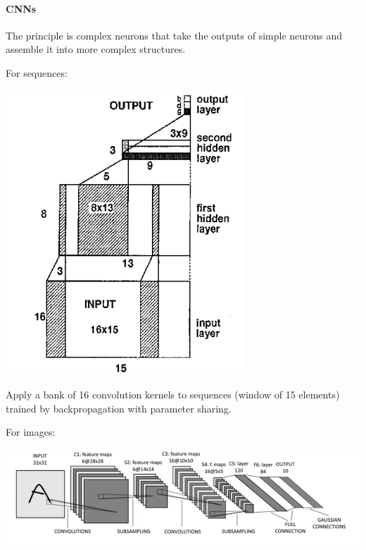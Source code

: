 \documentclass[10pt]{report}
\begin{document}
\paragraph{CNNs} The principle is complex neurons that take the outputs of simple neurons and assemble it into more complex structures.
\begin{multicols}{2}
For sequences:
\begin{center}
	\includegraphics[scale=0.5]{66.png}
\end{center}
Apply a bank of 16 convolution kernels to sequences (window of 15 elements) trained by backpropagation with parameter sharing.
\columnbreak

For images:
\begin{center}
	\includegraphics[scale=0.35]{50.png}
\end{center}
\end{multicols}
\end{document}
